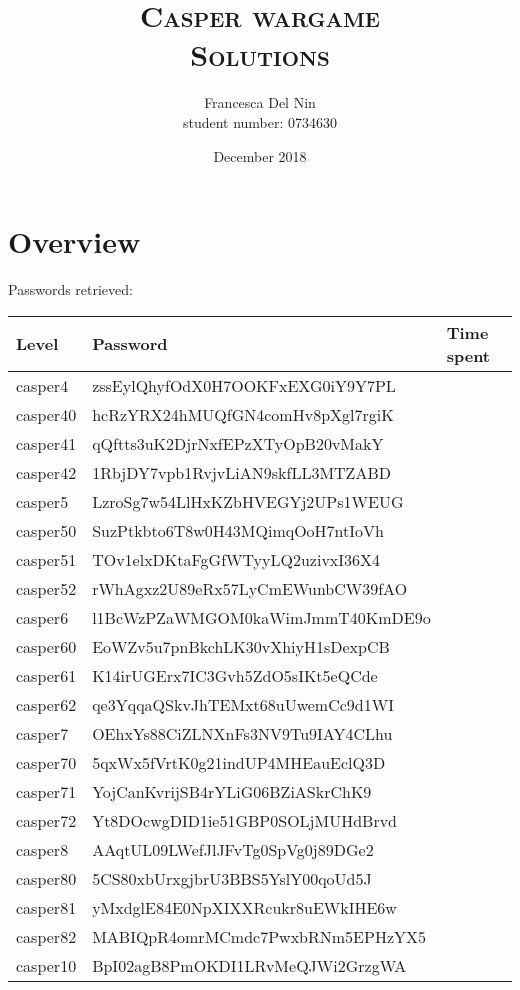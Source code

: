 \documentclass[a4paper,12pt]{article}
\title{\scshape Casper wargame \\ Solutions}
\author{Francesca Del Nin \\ student number: 0734630}
\date{December 2018}
\begin{document}
\maketitle

\tableofcontents

\newpage
\section{Overview}
Passwords retrieved:
\begin{table}[]
\begin{tabular}{l|l|l}
 Level & Password & Time spent  \\
 \hline
 casper4 & zssEylQhyfOdX0H7OOKFxEXG0iY9Y7PL &   \\
 casper40 & hcRzYRX24hMUQfGN4comHv8pXgl7rgiK & \\
 casper41 & qQftts3uK2DjrNxfEPzXTyOpB20vMakY & \\
 casper42 & 1RbjDY7vpb1RvjvLiAN9skfLL3MTZABD & \\
  \hline
 casper5 & LzroSg7w54LlHxKZbHVEGYj2UPs1WEUG & \\
 casper50 & SuzPtkbto6T8w0H43MQimqOoH7ntIoVh & \\
 casper51 & TOv1elxDKtaFgGfWTyyLQ2uzivxI36X4 & \\
 casper52 & rWhAgxz2U89eRx57LyCmEWunbCW39fAO & \\
  \hline
 casper6 & l1BcWzPZaWMGOM0kaWimJmmT40KmDE9o &  \\
 casper60 & EoWZv5u7pnBkchLK30vXhiyH1sDexpCB & \\
 casper61 & K14irUGErx7IC3Gvh5ZdO5sIKt5eQCde & \\
 casper62 & qe3YqqaQSkvJhTEMxt68uUwemCc9d1WI & \\
  \hline
  casper7 & OEhxYs88CiZLNXnFs3NV9Tu9IAY4CLhu & \\
  casper70 & 5qxWx5fVrtK0g21indUP4MHEauEclQ3D & \\
  casper71 & YojCanKvrijSB4rYLiG06BZiASkrChK9 & \\
  casper72 & Yt8DOcwgDID1ie51GBP0SOLjMUHdBrvd & \\
  \hline
 casper8 & AAqtUL09LWefJlJFvTg0SpVg0j89DGe2 & \\
 casper80 & 5CS80xbUrxgjbrU3BBS5YslY00qoUd5J & \\
 casper81 & yMxdglE84E0NpXIXXRcukr8uEWkIHE6w & \\
 casper82 & MABIQpR4omrMCmdc7PwxbRNm5EPHzYX5 & \\
  \hline
 casper10 & BpI02agB8PmOKDI1LRvMeQJWi2GrzgWA &\\
\end{tabular}
\end{table}
\end{document}

